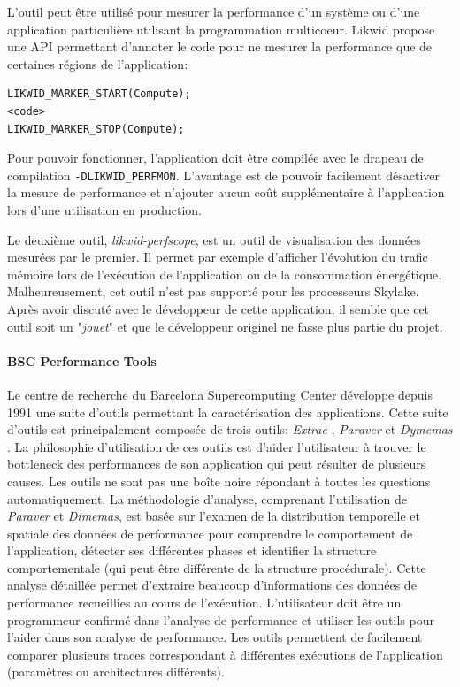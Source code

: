             L'outil peut être utilisé pour mesurer la performance d'un système ou d'une application particulière utilisant la programmation multicoeur. 
        Likwid propose une API permettant d'annoter le code pour ne mesurer la performance que de certaines régions de l'application:
\begin{lstlisting}
LIKWID_MARKER_START(Compute);
<code>
LIKWID_MARKER_STOP(Compute);
\end{lstlisting}
            Pour pouvoir fonctionner, l'application doit être compilée avec le drapeau de compilation \verb|-DLIKWID_PERFMON|. L'avantage est de pouvoir facilement désactiver la mesure de performance et n'ajouter aucun coût supplémentaire à l'application lors d'une utilisation en production.
        
        
            Le deuxième outil, \textit{likwid-perfscope}, est un outil de visualisation des données mesurées par le premier. Il permet par exemple d'afficher l'évolution du trafic mémoire lors de l'exécution de l'application ou de la consommation énergétique. Malheureusement, cet outil n'est pas supporté pour les processeurs Skylake. Après avoir discuté avec le développeur de cette application, il semble que cet outil soit un "\textit{jouet}" et que le développeur originel ne fasse plus partie du projet.
            
           
        \paragraph{BSC Performance Tools}
            Le centre de recherche du Barcelona Supercomputing Center développe depuis 1991 une suite d'outils permettant la caractérisation des applications. Cette suite d'outils est principalement composée de trois outils: \textit{Extrae} \cite{Rodriguez}, \textit{Paraver} \cite{Pillet1995} et \textit{Dymemas} \cite{Labarta1997}. La philosophie d'utilisation de ces outils est d'aider l'utilisateur à trouver le \gls{bottleneck} des performances de son application qui peut résulter de plusieurs causes. Les outils ne sont pas une boîte noire répondant à toutes les questions automatiquement. La méthodologie d'analyse, comprenant l'utilisation de \textit{Paraver} et \textit{Dimemas}, est basée sur l'examen de la distribution temporelle et spatiale des données de performance pour comprendre le comportement de l'application, détecter ses différentes phases et identifier la structure comportementale (qui peut être différente de la structure procédurale). Cette analyse détaillée permet d'extraire beaucoup d'informations des données de performance recueillies au cours de l'exécution. L'utilisateur doit être un programmeur confirmé dans l'analyse de performance et utiliser les outils pour l'aider dans son analyse de performance. Les outils permettent de facilement comparer plusieurs traces correspondant à différentes exécutions de l'application (paramètres ou architectures différents). 
            
